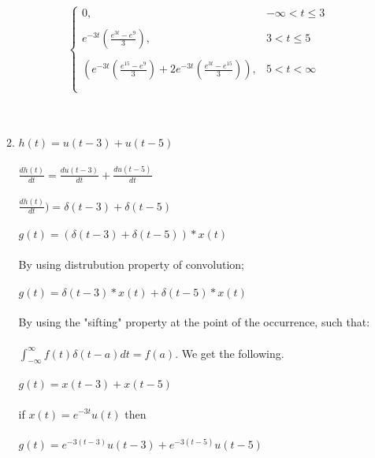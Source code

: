 \documentclass[10pt,a4paper, margin=1in]{article}
\begin{document}
\begin{enumerate}
\begin{enumerate}
\[\begin{cases}
		\text{0,} & -\infty < t \le 3\\\\
		e^{-3t}(\frac{e^{3t} - e^{9}}{3}), & 3 < t \le 5 \\\\
		(e^{-3t}(\frac{e^{15}-e^{9}}{3}) +2e^{-3t}(\frac{e^{3t} -e^{15}}{3})), & 5 < t < \infty\\\\
		\end{cases}
		\]\\\\
    \item %
    $h(t) = u(t-3) + u(t-5)$\\\\
    $\frac{dh(t)}{dt} = \frac{du(t-3)}{dt} + \frac{du(t-5)}{dt}$\\\\
    $\frac{dh(t)}{dt}) = \delta(t-3) + \delta(t-5)$\\\\
    $g(t) = (\delta(t-3) + \delta(t-5))*x(t)$\\\\
    By using distrubution property of convolution;\\\\
    $g(t) = \delta(t-3)*x(t) + \delta(t-5)*x(t)$\\\\
    By using the "sifting" property at the point of the occurrence, such that:\\\\
    $\int^{\infty}_{-\infty}f(t)\delta(t-a)dt = f(a)$.
    We get the following.\\\\
    $g(t) = x(t-3) + x(t-5)$\\\\
    if $x(t) = e^{-3t}u(t)$ then \\\\
    $g(t) = e^{-3(t-3)}u(t-3) + e^{-3(t-5)}u(t-5)$
    \end{enumerate}

\end{enumerate}
\end{document}
